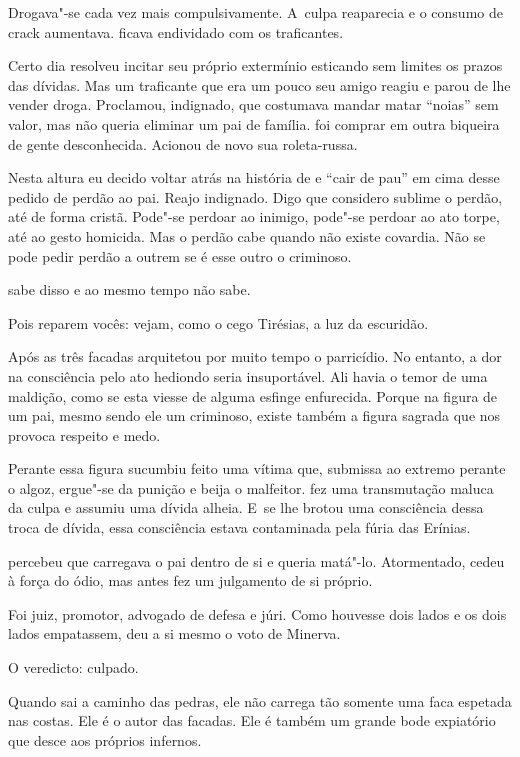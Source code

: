 Drogava"-se cada vez mais compulsivamente. A~culpa reaparecia e o consumo
de crack aumentava.  ficava endividado com os traficantes.

Certo dia  resolveu incitar seu próprio extermínio esticando sem
limites os prazos das dívidas. Mas um traficante que era um pouco seu
amigo reagiu e parou de lhe vender droga. Proclamou, indignado, que
costumava mandar matar ``noias'' sem valor, mas não queria eliminar um pai
de família.  foi comprar em outra biqueira de gente desconhecida.
Acionou de novo sua roleta-russa.

Nesta altura eu decido voltar atrás na história de  e ``cair de pau''
em cima desse pedido de perdão ao pai. Reajo indignado. Digo que
considero sublime o perdão, até de forma cristã. Pode"-se perdoar ao
inimigo, pode"-se perdoar ao ato torpe, até ao gesto homicida. Mas o
perdão cabe quando não existe covardia. Não se pode pedir perdão a
outrem se é esse outro o criminoso.

 sabe disso e ao mesmo tempo não sabe.

Pois reparem vocês: vejam, como o cego Tirésias, a luz da escuridão.

Após as três facadas  arquitetou por muito tempo o parricídio. No
entanto, a dor na consciência pelo ato hediondo seria insuportável. Ali
havia o temor de uma maldição, como se esta viesse de alguma esfinge
enfurecida. Porque na figura de um pai, mesmo sendo ele um criminoso,
existe também a figura sagrada que nos provoca respeito e medo.

Perante essa figura  sucumbiu feito uma vítima que, submissa ao
extremo perante o algoz, ergue"-se da punição e beija o malfeitor.  fez
uma transmutação maluca da culpa e assumiu uma dívida alheia. E~se lhe
brotou uma consciência dessa troca de dívida, essa consciência estava
contaminada pela fúria das Erínias.

 percebeu que carregava o pai dentro de si e queria matá"-lo.
Atormentado, cedeu à força do ódio, mas antes fez um julgamento de si
próprio.

Foi juiz, promotor, advogado de defesa e júri. Como houvesse dois lados
e os dois lados empatassem,  deu a si mesmo o voto de Minerva.

O veredicto: culpado.

\asterisc{}

Quando  sai a caminho das pedras, ele não carrega tão somente uma faca
espetada nas costas. Ele é o autor das facadas. Ele é também um grande
bode expiatório que desce aos próprios infernos.

